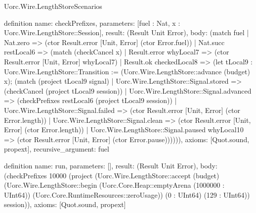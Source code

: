 \begin{lexlean}{Uorc.Wire.LengthStoreScenarios}
\begin{semanticmodule}
definition{
  name: checkPrefixes,
  parameters: [fuel : Nat, x : Uorc.Wire.LengthStore::Session],
  result: (Result Unit Error),
  body: (match fuel
    | Nat.zero => (ctor Result.error [Unit, Error] (ctor Error.fuel))
    | Nat.succ restLocal6 => (match (checkCancel x)
      | Result.error whyLocal7 => (ctor Result.error [Unit, Error] whyLocal7)
      | Result.ok checkedLocal8 => (let tLocal9 : Uorc.Wire.LengthStore::Transition := (Uorc.Wire.LengthStore::advance (budget) x); (match (project tLocal9 signal)
        | Uorc.Wire.LengthStore::Signal.stored => (checkCancel (project tLocal9 session))
        | Uorc.Wire.LengthStore::Signal.advanced => (checkPrefixes restLocal6 (project tLocal9 session))
        | Uorc.Wire.LengthStore::Signal.failed => (ctor Result.error [Unit, Error] (ctor Error.length))
        | Uorc.Wire.LengthStore::Signal.clean => (ctor Result.error [Unit, Error] (ctor Error.length))
        | Uorc.Wire.LengthStore::Signal.paused whyLocal10 => (ctor Result.error [Unit, Error] (ctor Error.pause)))))),
  axioms: [Quot.sound, propext],
  recursive_argument: fuel
}

definition{
  name: run,
  parameters: [],
  result: (Result Unit Error),
  body: (checkPrefixes 10000 (project (Uorc.Wire.LengthStore::accept (budget) (Uorc.Wire.LengthStore::begin (Uorc.Core.Heap::emptyArena (1000000 : UInt64)) (Uorc.Core.RuntimeResources::zeroUsage)) (0 : UInt64) (129 : UInt64)) session)),
  axioms: [Quot.sound, propext]
}
\end{semanticmodule}
\end{lexlean}
